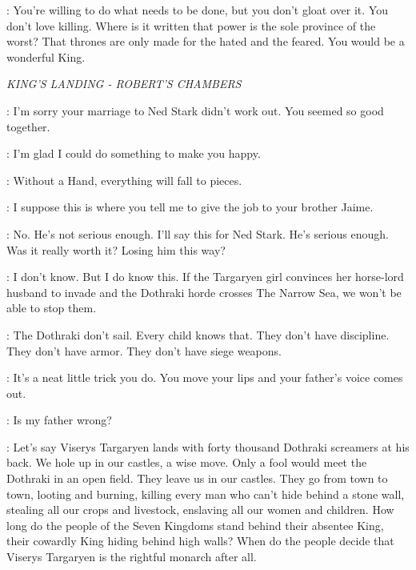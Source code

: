 
\LORAS: You're willing to do what needs to be done, but you don't gloat over it. You don't love killing. Where is it written that power is the sole province of the worst? That thrones are only made for the hated and the feared. You would be a wonderful King. 



\scene

\textit{KING'S LANDING - ROBERT'S CHAMBERS} 


\CERSEI: I'm sorry your marriage to Ned Stark didn't work out. You seemed so good together. 

\ROBERT: I'm glad I could do something to make you happy. 

\CERSEI: Without a Hand, everything will fall to pieces. 

\ROBERT: I suppose this is where you tell me to give the job to your brother Jaime. 

\CERSEI: No. He's not serious enough. I'll say this for Ned Stark.  He's serious enough. Was it really worth it? Losing him this way? 

\ROBERT: I don't know. But I do know this.  If the Targaryen girl convinces her horse-lord husband to invade and the Dothraki horde crosses The Narrow Sea, we won't be able to stop them. 

\CERSEI: The Dothraki don't sail. Every child knows that. They don't have discipline. They don't have armor. They don't have siege weapons. 

\ROBERT: It's a neat little trick you do.  You move your lips and your father's voice comes out. 

\CERSEI: Is my father wrong? 

\ROBERT: Let's say Viserys Targaryen lands with forty thousand Dothraki screamers at his back. We hole up in our castles, a wise move. Only a fool would meet the Dothraki in an open field. They leave us in our castles. They go from town to town, looting and burning, killing every man who can't hide behind a stone wall, stealing all our crops and livestock, enslaving all our women and children. How long do the people of the Seven Kingdoms stand behind their absentee King, their cowardly King hiding behind high walls? When do the people decide that Viserys Targaryen is the rightful monarch after all. 

